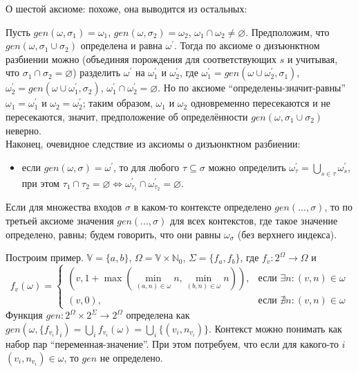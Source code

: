 





\hrulefill

О шестой аксиоме: похоже, она выводится из остальных:

Пусть $gen(\omega,\sigma_1) = \omega_1$, $gen(\omega,\sigma_2) = \omega_2$, $\omega_1\cap\omega_2\ne\varnothing$. Предположим, что $gen(\omega,\sigma_1\cup\sigma_2)$ определена и равна $\omega^\prime$. Тогда по аксиоме о дизъюнктном разбиении можно (объединяя порождения для соответствующих $s$ и учитывая, что $\sigma_1\cap\sigma_2 = \varnothing$) разделить $\omega^\prime$ на $\omega^\prime_1$ и $\omega^\prime_2$, где $\omega^\prime_1 = gen(\omega\cup\omega^\prime_2,\sigma_1)$, $\omega^\prime_2 = gen(\omega\cup\omega^\prime_1,\sigma_2)$, $\omega^\prime_1 \cap \omega^\prime_2 = \varnothing$. Но по аксиоме ``определены-значит-равны'' $\omega_1 = \omega^\prime_1$ и $\omega_2 = \omega^\prime_2$; таким образом, $\omega_1$ и $\omega_2$ одновременно пересекаются и не пересекаются, значит, предположение об определённости $gen(\omega,\sigma_1\cup\sigma_2)$ неверно.
\\

Наконец, очевидное следствие из аксиомы о дизъюнктном разбиении:

\begin{itemize}
	\item если $gen(\omega,\sigma)=\omega^\prime$, то для любого $\tau \subseteq \sigma$ можно определить $\omega^\prime_\tau =\bigcup\limits_{s\in\tau}\omega^\prime_s$, при этом $\tau_1 \cap \tau_2 = \varnothing \Leftrightarrow \omega^\prime_{\tau_1} \cap \omega^\prime_{\tau_2} = \varnothing$.
\end{itemize}

Если для множества входов $\sigma$ в каком-то контексте определено $gen(..., \sigma)$, то по третьей аксиоме значения $gen(..., \sigma)$ для всех контекстов, где такое значение определено, равны; будем говорить, что они равны $\omega_\sigma$ (без верхнего индекса).

\newpage

Построим пример. $\mathbb{V} = \{a, b\}$, $\Omega = \mathbb{V} \times \mathbb{N}_0
$, $\Sigma = \{f_a, f_b\}$, где $f_v : 2^\Omega \to \Omega$ и
$$f_v(\omega) = \begin{cases}
    (v, 1 + \max(\min\limits_{(a, n)\in\omega} n, \min\limits_{(b, n)\in\omega} n)), & \mbox{если } \exists n: (v, n) \in \omega\\
	(v, 0), & \mbox{если } \nexists n: (v, n) \in \omega
\end{cases}$$
Функция $gen : 2^\Omega \times 2^\Sigma \to 2^\Omega$ определена как $gen(\omega, \{f_{v_i}\}_i) = \bigcup\limits_i f_{v_i}(\omega) = \bigcup\limits_i \{(v_i, n_{v_i})\}$. Контекст можно понимать как набор пар ``переменная-значение''. При этом потребуем, что если для какого-то $i$ $(v_i, n_{v_i}) \in \omega$, то $gen$ не определено.

